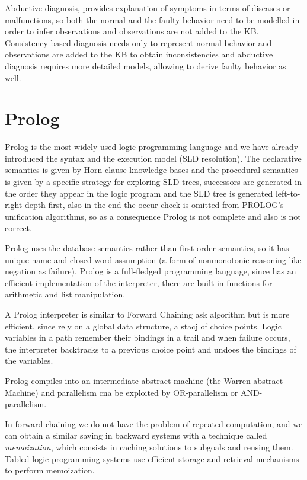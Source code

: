 Abductive diagnosis, provides explanation of symptoms in terms of diseases or malfunctions,
so both the normal and the faulty behavior need to be modelled in order to infer observations 
and observations are not added to the KB.\newline
Consistency based diagnosis needs only to represent normal behavior and observations are
added to the KB to obtain inconsistencies and abductive diagnosis requires
more detailed models, allowing to derive faulty behavior as well.

\section{Prolog}
Prolog is the most widely used logic programming language and we have already introduced 
the syntax and the execution model (SLD resolution).\newline
The declarative semantics is given by Horn clause knowledge bases and the procedural semantics
is given by a specific strategy for exploring SLD trees, successors are generated in the 
order they appear in the logic program and the SLD tree is generated left-to-right depth first,
also in the end the occur check is omitted from PROLOG's unification algorithms, so as a 
consequence Prolog is not complete and also is not correct.

Prolog uses the database semantics rather than first-order semantics, so it has unique name 
and closed word assumption (a form of nonmonotonic reasoning like negation as failure).\newline
Prolog is a full-fledged programming language, since has an efficient implementation of the 
interpreter, there are built-in functions for arithmetic and list manipulation.

A Prolog interpreter is similar to Forward Chaining ask algorithm but is more efficient, since
rely on a global data structure, a stacj of choice points.\newline
Logic variables in a path remember their bindings in a trail and when failure occurs, the 
interpreter backtracks to a previous choice point and undoes the bindings of the variables.

Prolog compiles into an intermediate abstract machine (the Warren abstract Machine) and 
parallelism cna be exploited by OR-parallelism or AND-parallelism.

In forward chaining we do not have the problem of repeated computation, and we can obtain a 
similar saving in backward systems with a technique called \emph{memoization}, which consists
in caching solutions to subgoals and reusing them.\newline
Tabled logic programming systems use efficient storage and retrieval mechanisms to 
perform memoization.

